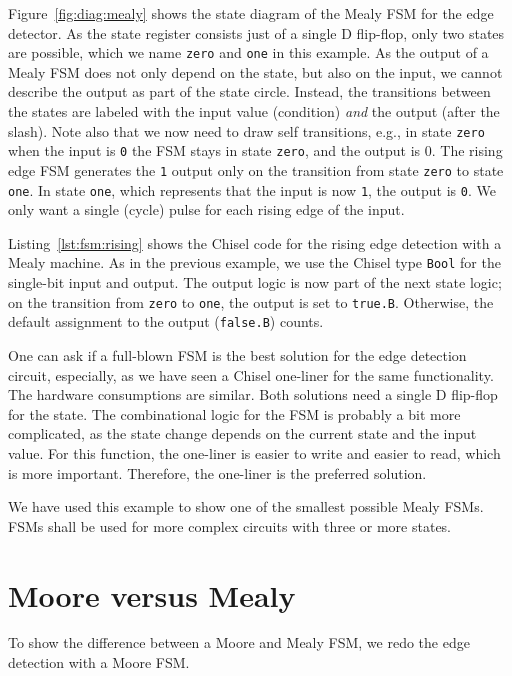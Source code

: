 \documentclass[%
    10pt,
    headinclude, footexclude,
    openright, %
    notitlepage,
    cleardoubleempty,
    headsepline,
    pointlessnumbers,
    bibtotoc, idxtotoc,
    ]{scrbook}
\newcommand{\code}[1]{{\small{\texttt{#1}}}}
\begin{document}
Figure~\ref{fig:diag:mealy} shows the state diagram of the Mealy FSM for the
edge detector. As the state register consists just of a single D flip-flop,
only two states are possible, which we name \code{zero} and \code{one} in this
example.
As the output of a Mealy FSM does not only depend on the state, but also
on the input, we cannot describe the output as part of the state circle.
Instead, the transitions between the states are labeled with the input
value (condition) \emph{and} the output (after the slash).
Note also that we now need to draw self transitions, e.g., in state \code{zero} when
the input is \code{0} the FSM stays in state \code{zero}, and the output is {0}.
The rising edge FSM generates the \code{1} output only on the transition
from state \code{zero} to state \code{one}. In state \code{one}, which represents
that the input is now \code{1}, the output is \code{0}. We only want a single (cycle)
pulse for each rising edge of the input.


Listing~\ref{lst:fsm:rising} shows the Chisel code for the rising edge detection
with a Mealy machine.
As in the previous example, we use the Chisel type \code{Bool} for the
single-bit input and output.
The output logic is now part of the next state logic; on the transition from
\code{zero} to \code{one}, the output is set to \code{true.B}. Otherwise,
the default assignment to the output (\code{false.B}) counts.

One can ask if a full-blown FSM is the best solution for the edge detection circuit,
especially, as we have seen a Chisel one-liner for the same functionality.
The hardware consumptions are similar. Both solutions need a single D flip-flop
for the state. The combinational logic for the FSM is probably a bit more complicated, as
the state change depends on the current state and the input value.
For this function, the one-liner is easier to write and easier to read,
which is more important. Therefore, the one-liner is the preferred solution.

We have used this example to show one of the smallest possible Mealy FSMs.
FSMs shall be used for more complex circuits with three or more states.

\section{Moore versus Mealy}

To show the difference between a Moore and Mealy FSM, we redo the edge
detection with a Moore FSM.
\end{document}
